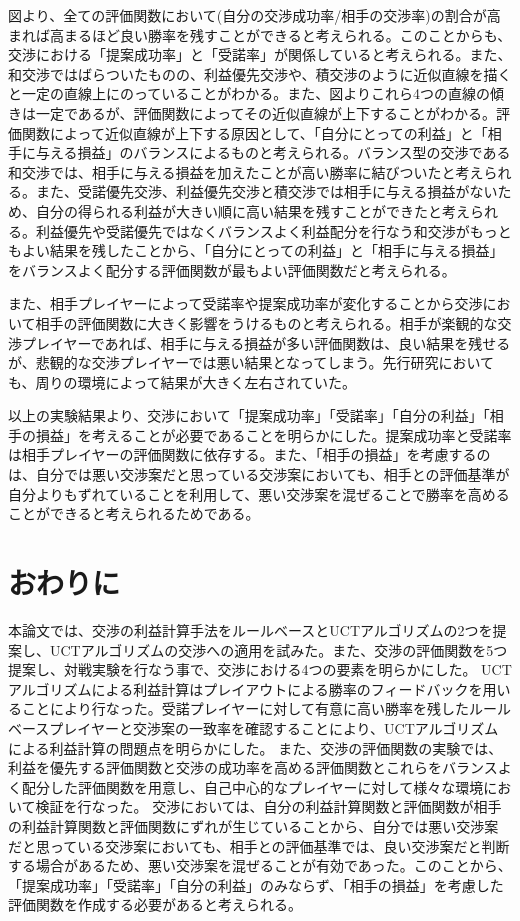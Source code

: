 \documentclass[a4, 10pt,dvipdfmx,twocolumn]{jsarticle}
\begin{document}
図より、全ての評価関数において(自分の交渉成功率/相手の交渉率)の割合が高まれば高まるほど良い勝率を残すことができると考えられる。このことからも、交渉における「提案成功率」と「受諾率」が関係していると考えられる。また、和交渉ではばらついたものの、利益優先交渉や、積交渉のように近似直線を描くと一定の直線上にのっていることがわかる。また、図よりこれら4つの直線の傾きは一定であるが、評価関数によってその近似直線が上下することがわかる。評価関数によって近似直線が上下する原因として、「自分にとっての利益」と「相手に与える損益」のバランスによるものと考えられる。バランス型の交渉である和交渉では、相手に与える損益を加えたことが高い勝率に結びついたと考えられる。また、受諾優先交渉、利益優先交渉と積交渉では相手に与える損益がないため、自分の得られる利益が大きい順に高い結果を残すことができたと考えられる。利益優先や受諾優先ではなくバランスよく利益配分を行なう和交渉がもっともよい結果を残したことから、「自分にとっての利益」と「相手に与える損益」をバランスよく配分する評価関数が最もよい評価関数だと考えられる。

また、相手プレイヤーによって受諾率や提案成功率が変化することから交渉において相手の評価関数に大きく影響をうけるものと考えられる。相手が楽観的な交渉プレイヤーであれば、相手に与える損益が多い評価関数は、良い結果を残せるが、悲観的な交渉プレイヤーでは悪い結果となってしまう。先行研究\cite{ito2012complex}においても、周りの環境によって結果が大きく左右されていた。

以上の実験結果より、交渉において「提案成功率」「受諾率」「自分の利益」「相手の損益」を考えることが必要であることを明らかにした。提案成功率と受諾率は相手プレイヤーの評価関数に依存する。また、「相手の損益」を考慮するのは、自分では悪い交渉案だと思っている交渉案においても、相手との評価基準が自分よりもずれていることを利用して、悪い交渉案を混ぜることで勝率を高めることができると考えられるためである。




\section{おわりに}

本論文では、交渉の利益計算手法をルールベースとUCTアルゴリズムの2つを提案し、UCTアルゴリズムの交渉への適用を試みた。また、交渉の評価関数を5つ提案し、対戦実験を行なう事で、交渉における4つの要素を明らかにした。
UCTアルゴリズムによる利益計算はプレイアウトによる勝率のフィードバックを用いることにより行なった。受諾プレイヤーに対して有意に高い勝率を残したルールベースプレイヤーと交渉案の一致率を確認することにより、UCTアルゴリズムによる利益計算の問題点を明らかにした。
また、交渉の評価関数の実験では、利益を優先する評価関数と交渉の成功率を高める評価関数とこれらをバランスよく配分した評価関数を用意し、自己中心的なプレイヤーに対して様々な環境において検証を行なった。
交渉においては、自分の利益計算関数と評価関数が相手の利益計算関数と評価関数にずれが生じていることから、自分では悪い交渉案だと思っている交渉案においても、相手との評価基準では、良い交渉案だと判断する場合があるため、悪い交渉案を混ぜることが有効であった。このことから、「提案成功率」「受諾率」「自分の利益」のみならず、「相手の損益」を考慮した評価関数を作成する必要があると考えられる。
\end{document}
